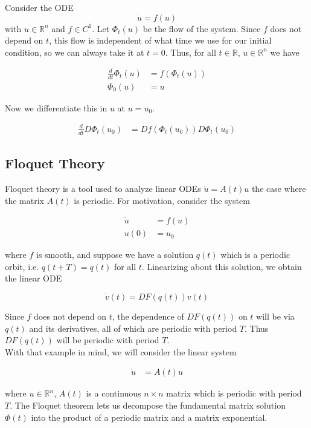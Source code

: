 \documentclass{article}
\def\R{{\mathbb R}}
\begin{document}
Consider the ODE
\[
\dot{u} = f(u)
\]
with $u \in \R^n$ and $f \in C^1$. Let $\Phi_t(u)$ be the flow of the system. Since $f$ does not depend on $t$, this flow is independent of what time we use for our initial condition, so we can always take it at $t = 0$. Thus, for all $t \in \R$, $u \in \R^n$ we have

\begin{align*}
\frac{d}{dt}\Phi_t(u) &= f(\Phi_t(u)) \\
\Phi_0(u) &= u
\end{align*}

Now we differentiate this in $u$ at $u = u_0$.

\begin{align*}
\frac{d}{dt} D\Phi_t(u_0) &= Df(\Phi_t(u_0)) D\Phi_t(u_0)
\end{align*}

\subsection{Floquet Theory}

Floquet theory is a tool used to analyze linear ODEs $\dot{u} = A(t) u$ the case where the matrix $A(t)$ is periodic. For motivation, consider the system

\begin{align*}
\dot{u} &= f(u) \\
u(0) &= u_0
\end{align*}

where $f$ is smooth, and suppose we have a solution $q(t)$ which is a periodic orbit, i.e. $q(t + T) = q(t)$ for all $t$. Linearizing about this solution, we obtain the linear ODE

\[
\dot{v}(t) = DF(q(t)) v(t)
\]

Since $f$ does not depend on $t$, the dependence of $DF(q(t))$ on $t$ will be via $q(t)$ and its derivatives, all of which are periodic with period $T$. Thus $DF(q(t))$ will be periodic with period $T$. \\

With that example in mind, we will consider the linear system

\begin{align*}
\dot{u} &= A(t) u
\end{align*}

where $u \in \R^n$, $A(t)$ is a continuous $n \times n$ matrix which is periodic with period $T$. The Floquet theorem lets us decompose the fundamental matrix solution $\Phi(t)$ into the product of a periodic matrix and a matrix exponential.
\end{document}
